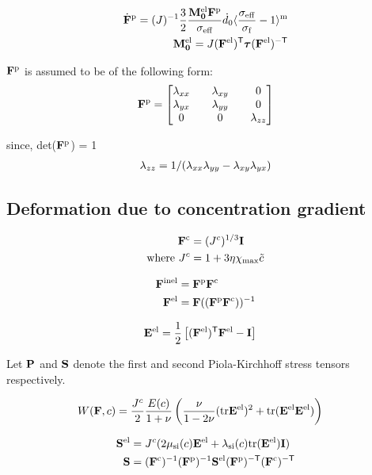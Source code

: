 \documentclass[../main.tex]{subfiles}
\begin{document}
\begin{align}
\dot{\F}^\p = \inv{J} \fc{3}{2} \fc{\Mel \F^\p}{\sigmaeff} \dZEROdot \langle \fc{\sigmaeff}{\sigmaf} - 1 \rangle^\m  \\
\Mel = J (\F^\el)^\T \DCS (\F^\el)^\mT
\end{align}

$\F^{\rm{p}}$ is assumed to be of the following form:
\begin{align}
    \F^\p = \tensorxy{\lambda}
\end{align}

since, det($\F^\p$) = 1
\begin{gather}
     \lamzz = 1/(\lamxx \lamyy - \lamxy \lamyx)
\end{gather}



\subsection{Deformation due to concentration gradient}
\begin{align}
    \F^\c &= (\jc)^{1/3} \I \\
    \text{where } \jc &= 1 + 3 \eta \xmax \tc
\end{align}



\begin{align}
    \F^\inel &= \F^\p \F^\c\\
    \F^\el &=  \F \inv{(\F^\p \F^\c)}
\end{align}






\begin{align}
\E^{\el} &= \fc{1}{2} \left[ (\F^\el)^\T \F^\el - \I \right]
\end{align}





Let $\PK$ and $\PKS$ denote the first and second Piola-Kirchhoff stress tensors respectively.

\begin{align}
    W(\F, c) &= \fc{\jc}{2}\fc{E(c)}{1 + \nu}\left( \fc{\nu}{1-2\nu}(\text{tr}\E^\el)^2 + \tr{\E^\el \E^\el}\right)
\end{align}

\begin{align}
    \PKS^\el &= \jc( 2 \muSic \E^\el + \lamSic \tr{\E^\el}\I )\\
    \PKS &= \inv{\F^\c} \inv{\F^\p} \PKS^\el \invT{\F^\p} \invT{\F^\c} 
\end{align}
\end{document}

